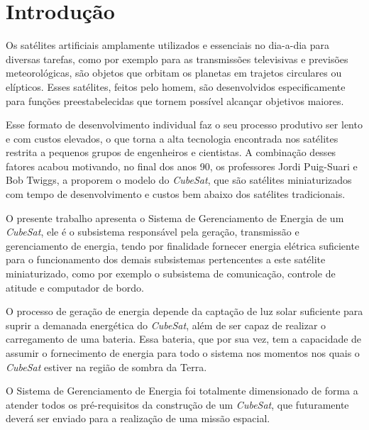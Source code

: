 \documentclass[
	12pt,				%
	openright,			%
	oneside,			%
	a4paper,			%
	english,			%
	french,				%
	spanish,			%
	brazil,				%
	oldfontcommands
	]{abntex2}
\begin{document}
\chapter[Introdução]{Introdução}

	Os satélites artificiais amplamente utilizados e essenciais no dia-a-dia para diversas tarefas, como por exemplo para as transmissões televisivas e previsões meteorológicas, são objetos que orbitam os planetas em trajetos circulares ou elípticos. Esses satélites, feitos pelo homem, são desenvolvidos especificamente para funções preestabelecidas que tornem possível alcançar objetivos maiores. 
	
	Esse formato de desenvolvimento individual faz o seu processo produtivo ser lento e com custos elevados, o que torna a alta tecnologia encontrada nos satélites restrita a pequenos grupos de engenheiros e cientistas. A combinação desses fatores acabou motivando, no final dos anos 90, os professores Jordi Puig-Suari e Bob Twiggs, a proporem o modelo do \textit{CubeSat}, que são satélites miniaturizados com tempo de desenvolvimento e custos bem abaixo dos satélites tradicionais.
	
	O presente trabalho apresenta o Sistema de Gerenciamento de Energia de um \textit{CubeSat}, ele é o subsistema responsável pela geração, transmissão e gerenciamento de energia, tendo por finalidade fornecer energia elétrica suficiente para o funcionamento dos demais subsistemas pertencentes a este satélite miniaturizado, como por exemplo o subsistema de comunicação, controle de atitude e computador de bordo.
	
	O processo de geração de energia depende da captação de luz solar suficiente para suprir a demanada energética do \textit{CubeSat}, além de ser capaz de realizar o carregamento de uma bateria. Essa bateria, que por sua vez, tem a capacidade de assumir o fornecimento de energia para todo o sistema nos momentos nos quais o \textit{CubeSat} estiver na região de sombra da Terra.
	
	O Sistema de Gerenciamento de Energia foi totalmente dimensionado de forma a atender todos os pré-requisitos da construção de um \textit{CubeSat}, que futuramente deverá ser enviado para a realização de uma missão espacial.

\end{document}
